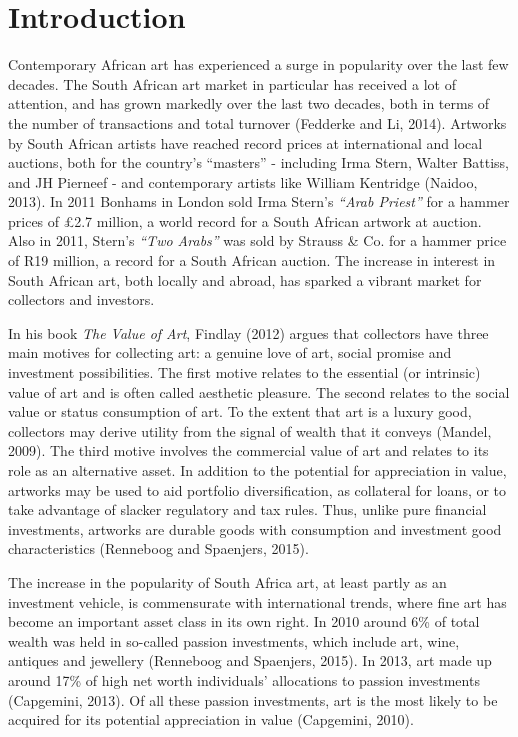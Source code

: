 \documentclass[12pt,]{article}
\begin{document}
\section{Introduction}\label{introduction}

Contemporary African art has experienced a surge in popularity over the
last few decades. The South African art market in particular has
received a lot of attention, and has grown markedly over the last two
decades, both in terms of the number of transactions and total turnover
(Fedderke and Li, 2014). Artworks by South African artists have reached
record prices at international and local auctions, both for the
country's ``masters'' - including Irma Stern, Walter Battiss, and JH
Pierneef - and contemporary artists like William Kentridge (Naidoo,
2013). In 2011 Bonhams in London sold Irma Stern's \emph{``Arab
Priest''} for a hammer prices of £2.7 million, a world record for a
South African artwork at auction. Also in 2011, Stern's \emph{``Two
Arabs''} was sold by Strauss \& Co. for a hammer price of R19 million, a
record for a South African auction. The increase in interest in South
African art, both locally and abroad, has sparked a vibrant market for
collectors and investors.

In his book \emph{The Value of Art}, Findlay (2012) argues that
collectors have three main motives for collecting art: a genuine love of
art, social promise and investment possibilities. The first motive
relates to the essential (or intrinsic) value of art and is often called
aesthetic pleasure. The second relates to the social value or status
consumption of art. To the extent that art is a luxury good, collectors
may derive utility from the signal of wealth that it conveys (Mandel,
2009). The third motive involves the commercial value of art and relates
to its role as an alternative asset. In addition to the potential for
appreciation in value, artworks may be used to aid portfolio
diversification, as collateral for loans, or to take advantage of
slacker regulatory and tax rules. Thus, unlike pure financial
investments, artworks are durable goods with consumption and investment
good characteristics (Renneboog and Spaenjers, 2015).

The increase in the popularity of South Africa art, at least partly as
an investment vehicle, is commensurate with international trends, where
fine art has become an important asset class in its own right. In 2010
around 6\% of total wealth was held in so-called passion investments,
which include art, wine, antiques and jewellery (Renneboog and
Spaenjers, 2015). In 2013, art made up around 17\% of high net worth
individuals' allocations to passion investments (Capgemini, 2013). Of
all these passion investments, art is the most likely to be acquired for
its potential appreciation in value (Capgemini, 2010).
\end{document}
